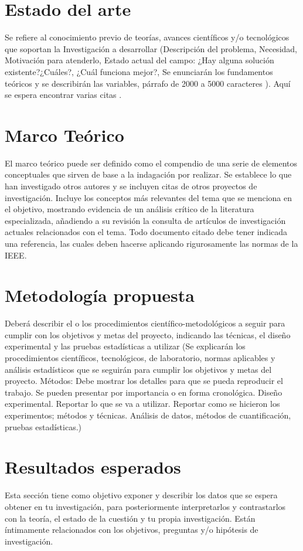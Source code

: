 \documentclass[letterpaper,12pt,oneside]{article}
\begin{document}
\section{Estado del arte}
Se refiere al conocimiento previo de teorías, avances científicos y/o tecnológicos que soportan la Investigación a desarrollar (Descripción del problema, Necesidad, Motivación para atenderlo, Estado actual del campo: ¿Hay alguna solución existente?¿Cuáles?, ¿Cuál funciona mejor?, Se enunciarán los fundamentos teóricos y se describirán las variables, párrafo de 2000 a 5000 caracteres \cite{gree00}). Aquí se espera encontrar varias citas \cite{colu92}. 

\section{Marco Teórico}
El marco teórico puede ser definido como el compendio de una serie de elementos conceptuales que sirven de base a la indagación por realizar. Se establece lo que han investigado otros autores y se incluyen citas de otros proyectos de investigación.
Incluye los conceptos más relevantes del tema que se menciona en el objetivo, mostrando evidencia de un análisis crítico de la literatura especializada, añadiendo a su revisión la consulta de artículos de investigación actuales relacionados con el tema. 
Todo documento citado debe tener indicada una referencia, las cuales deben hacerse aplicando rigurosamente las normas de la IEEE.

\section{Metodología propuesta}
Deberá describir el o los procedimientos científico-metodológicos a seguir para cumplir con los objetivos y metas del proyecto, indicando las técnicas, el diseño experimental y las pruebas estadísticas a utilizar (Se explicarán los procedimientos científicos, tecnológicos, de laboratorio, normas aplicables y análisis estadísticos que se seguirán para cumplir los objetivos y metas del proyecto. Métodos: Debe mostrar los detalles para que se pueda reproducir el trabajo. Se pueden presentar por importancia o en forma cronológica. Diseño experimental. Reportar lo que se va a utilizar. Reportar como se hicieron los experimentos; métodos y técnicas. Análisis  de datos, métodos de cuantificación, pruebas estadísticas.)

\section{Resultados esperados}
Esta sección tiene como objetivo exponer y describir los datos que se espera obtener en tu investigación, para posteriormente interpretarlos y contrastarlos con la teoría, el estado de la cuestión y tu propia investigación. Están íntimamente relacionados con los objetivos, preguntas y/o hipótesis de investigación. 
\end{document}
